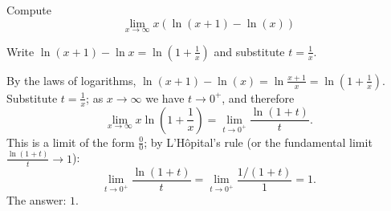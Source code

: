 
\begin{question}
Compute
\[ \lim_{x\to\infty} x\left(\ln(x+1)-\ln(x)\right) \]
\end{question}

\begin{hint}
Write $\ln(x+1)-\ln x=\ln\left(1+\frac1x\right)$ and substitute $t=\frac1x$.
\end{hint}

\begin{solution}
By the laws of logarithms, $\ln(x+1)-\ln(x)=\ln\frac{x+1}{x}=\ln\left(1+\frac1x\right)$. Substitute $t=\frac1x$; as $x\to\infty$ we have $t\to0^+$, and therefore
\[ \lim_{x\to\infty} x\ln\left(1+\frac1x\right)=\lim_{t\to0^+}\frac{\ln(1+t)}{t}. \]
This is a limit of the form $\frac00$; by L'Hôpital's rule (or the fundamental limit $\frac{\ln(1+t)}{t}\to1$):
\[ \lim_{t\to0^+}\frac{\ln(1+t)}{t}=\lim_{t\to0^+}\frac{1/(1+t)}{1}=1. \]
The answer: $\boxed{1}$.
\end{solution}
